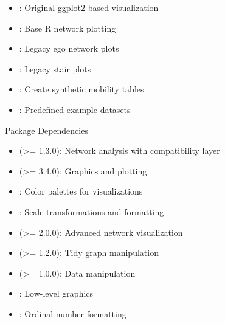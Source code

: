 \documentclass[a4paper]{book}
\begin{document}
\begin{Details}
\begin{itemize}
\end{itemize}


\begin{itemize}

\item{} : Original ggplot2-based visualization
\item{} : Base R network plotting
\item{} : Legacy ego network plots
\item{} : Legacy stair plots

\end{itemize}


\begin{itemize}

\item{} : Create synthetic mobility tables
\item{} : Predefined example datasets

\end{itemize}

\end{Details}
%
\begin{Section}{Package Dependencies}

\begin{itemize}

\item{}  (>= 1.3.0): Network analysis with compatibility layer
\item{}  (>= 3.4.0): Graphics and plotting
\item{} : Color palettes for visualizations
\item{} : Scale transformations and formatting

\end{itemize}


\begin{itemize}

\item{}  (>= 2.0.0): Advanced network visualization
\item{}  (>= 1.2.0): Tidy graph manipulation
\item{}  (>= 1.0.0): Data manipulation

\end{itemize}


\begin{itemize}

\item{} : Low-level graphics
\item{} : Ordinal number formatting

\end{itemize}

\end{Section}
\end{document}

